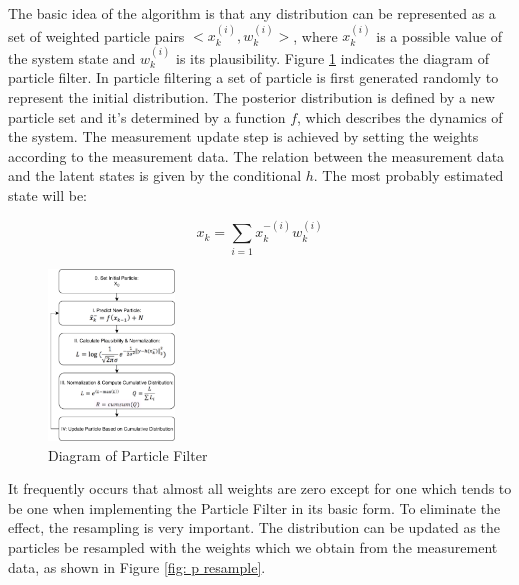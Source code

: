 \documentclass[10pt,twocolumn,letterpaper]{article}
\begin{document}
The basic idea of the algorithm is that any distribution can be represented as a set of weighted particle pairs $<x_k^{(i)}, w_k^{(i)}>$, where $x_k^{(i)}$ is a possible value of the system state and $w_k^{(i)}$ is its plausibility. Figure \ref{fig: particle} indicates the diagram of particle filter. In particle filtering a set of particle is first generated randomly to represent the initial distribution. The posterior distribution is defined by a new particle set and it's determined by a function $f$, which describes the dynamics of the system. The measurement update step is achieved by setting the weights according to the measurement data. The relation between the measurement data and the latent states is given by the conditional $h$. The most probably estimated state will be:

\begin{equation}
x_k=\sum_{i=1}x_k^{-(i)}w_k^{(i)}
\end{equation}

\begin{figure}[h]
     \centering
       \includegraphics[width=0.3\textwidth]{pic_5.png}
        \caption{\small{Diagram of Particle Filter}}
        \label{fig: particle}
 \end{figure}

It frequently occurs that almost all weights are zero except for one which tends to be one when implementing the Particle Filter in its basic form. To eliminate the effect, the resampling\cite{ref:doucet} is very important. The distribution can be updated as the particles be resampled with the weights which we obtain from the measurement data, as shown in Figure \ref{fig: p resample}.
\end{document}
